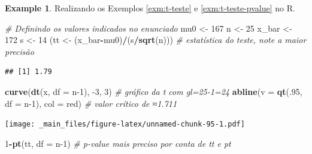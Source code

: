 \documentclass[
]{book}
\newenvironment{Shaded}{\begin{snugshade}}{\end{snugshade}}
\newcommand{\CommentTok}[1]{\textcolor[rgb]{0.56,0.35,0.01}{\textit{#1}}}
\newcommand{\DataTypeTok}[1]{\textcolor[rgb]{0.13,0.29,0.53}{#1}}
\newcommand{\DecValTok}[1]{\textcolor[rgb]{0.00,0.00,0.81}{#1}}
\newcommand{\KeywordTok}[1]{\textcolor[rgb]{0.13,0.29,0.53}{\textbf{#1}}}
\newcommand{\NormalTok}[1]{#1}
\newcommand{\OperatorTok}[1]{\textcolor[rgb]{0.81,0.36,0.00}{\textbf{#1}}}
\newcommand{\StringTok}[1]{\textcolor[rgb]{0.31,0.60,0.02}{#1}}
\theoremstyle{definition}
\theoremstyle{definition}
\newtheorem{example}{Example}[chapter]
\theoremstyle{definition}
\theoremstyle{remark}
\begin{document}
\begin{example}
\protect\hypertarget{exm:t-teste-r}{}{\label{exm:t-teste-r} }Realizando os Exemplos \ref{exm:t-teste} e \ref{exm:t-teste-pvalue} no R.
\end{example}

\begin{Shaded}
\begin{Highlighting}[]
\CommentTok{\# Definindo os valores indicados no enunciado}
\NormalTok{mu0 \textless{}{-}}\StringTok{ }\DecValTok{167}
\NormalTok{n \textless{}{-}}\StringTok{ }\DecValTok{25}
\NormalTok{x\_bar \textless{}{-}}\StringTok{ }\DecValTok{172}
\NormalTok{s \textless{}{-}}\StringTok{ }\DecValTok{14}
\NormalTok{(tt \textless{}{-}}\StringTok{ }\NormalTok{(x\_bar}\OperatorTok{{-}}\NormalTok{mu0)}\OperatorTok{/}\NormalTok{(s}\OperatorTok{/}\KeywordTok{sqrt}\NormalTok{(n))) }\CommentTok{\# estatística do teste, note a maior precisão}
\end{Highlighting}
\end{Shaded}

\begin{verbatim}
## [1] 1.79
\end{verbatim}

\begin{Shaded}
\begin{Highlighting}[]
\KeywordTok{curve}\NormalTok{(}\KeywordTok{dt}\NormalTok{(x, }\DataTypeTok{df =}\NormalTok{ n}\DecValTok{{-}1}\NormalTok{), }\DecValTok{{-}3}\NormalTok{, }\DecValTok{3}\NormalTok{) }\CommentTok{\# gráfico da t com gl=25{-}1=24}
\KeywordTok{abline}\NormalTok{(}\DataTypeTok{v =} \KeywordTok{qt}\NormalTok{(.}\DecValTok{95}\NormalTok{, }\DataTypeTok{df =}\NormalTok{ n}\DecValTok{{-}1}\NormalTok{), }\DataTypeTok{col =} \StringTok{\textquotesingle{}red\textquotesingle{}}\NormalTok{) }\CommentTok{\# valor crítico de ≈1.711}
\end{Highlighting}
\end{Shaded}

\texttt{[image: \_main\_files/figure-latex/unnamed-chunk-95-1.pdf]}

\begin{Shaded}
\begin{Highlighting}[]
\DecValTok{1}\OperatorTok{{-}}\KeywordTok{pt}\NormalTok{(tt, }\DataTypeTok{df =}\NormalTok{ n}\DecValTok{{-}1}\NormalTok{) }\CommentTok{\# p{-}value mais preciso por conta de tt e pt}
\end{Highlighting}
\end{Shaded}
\end{document}
